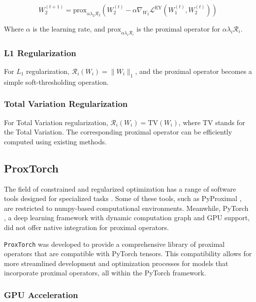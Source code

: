 \begin{equation}
\label{eq:proximal-update-W2}
    W_2^{(t+1)} = \text{prox}_{\alpha \lambda_2 \mathcal{R}_2}\left( W_2^{(t)} - \alpha \nabla_{W_2} \mathcal{L}^{\text{EY}}(W_1^{(t)}, W_2^{(t)}) \right)
\end{equation}

Where \( \alpha \) is the learning rate, and \( \text{prox}_{\alpha \lambda_i \mathcal{R}_i} \) is the proximal operator for \( \alpha \lambda_i \mathcal{R}_i \).

\subsubsection{L1 Regularization}
For \( L_1 \) regularization, \( \mathcal{R}_i(W_i) = \| W_i \|_1 \), and the proximal operator becomes a simple soft-thresholding operation.

\subsubsection{Total Variation Regularization}
For Total Variation regularization, \( \mathcal{R}_i(W_i) = \text{TV}(W_i) \), where TV stands for the Total Variation.
The corresponding proximal operator can be efficiently computed using existing methods.

\subsection{ProxTorch}

The field of constrained and regularized optimization has a range of software tools designed for specialized tasks \cite{Moolekamp, ParsimonY}. Some of these tools, such as PyProximal \cite{pyproximal}, are restricted to numpy-based computational environments. Meanwhile, PyTorch \cite{paszke2019pytorch}, a deep learning framework with dynamic computation graph and GPU support, did not offer native integration for proximal operators. 

\texttt{ProxTorch} was developed to provide a comprehensive library of proximal operators that are compatible with PyTorch tensors. This compatibility allows for more streamlined development and optimization processes for models that incorporate proximal operators, all within the PyTorch framework.

\subsubsection{GPU Acceleration}

